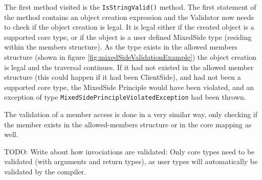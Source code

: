 		The first method visited is the \texttt{IsStringValid()} method. The first statement of the method contains an object creation expression and the Validator now needs to check if the object creation is legal. It is legal either if the created object is a supported core type, or if the object is a user defined MixedSide type (residing within the members structure). As the type exists in the allowed members structure (shown in figure \ref{fig:mixedSideValidationExample}) the object creation is legal and the traversal continues. If it had not existed in the allowed member structure (this could happen if it had been ClientSide), and had not been a supported core type, the MixedSide Principle would have been violated, and an exception of type \texttt{MixedSidePrincipleViolatedException} had been thrown.

		The validation of a member access is done in a very similar way, only checking if the member exists in the allowed-members structure or in the core mapping as well.

		TODO: Write about how invociations are validated: Only core types need to be validated (with arguments and return types), as user types will automatically be validated by the compiler.








	
